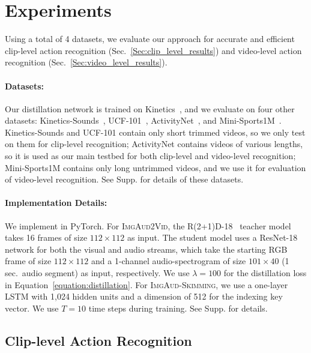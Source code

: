 \section{Experiments}\label{sec:results}
\vspace{-0.05in}

Using a total of 4 datasets, we evaluate our approach for accurate and efficient clip-level action recognition (Sec.~\ref{Sec:clip_level_results}) and video-level action recognition (Sec.~\ref{Sec:video_level_results}).

\vspace{-0.05in}
\paragraph{Datasets:} Our distillation network is trained on Kinetics~\cite{kay2017kinetics}, and we evaluate on four other datasets: Kinetics-Sounds~\cite{arandjelovic2017look}, UCF-101~\cite{soomro2012ucf101}, ActivityNet~\cite{caba2015activitynet}, and Mini-Sports1M~\cite{karpathy2014large}. Kinetics-Sounds and UCF-101 contain only short trimmed videos, so we only test on them for clip-level recognition; ActivityNet contains videos of various lengths, so it is used as our main testbed for both clip-level and video-level recognition; Mini-Sports1M contains only long untrimmed videos, and we use it for evaluation of video-level recognition. See Supp. for details of these datasets.

\vspace{-0.05in}
\paragraph{Implementation Details:} We implement in PyTorch. For \textsc{ImgAud2Vid}, the R(2+1)D-18~\cite{tran2018closer} teacher model takes 16 frames of size $112 \times 112$ as input. The student model uses a ResNet-18 network for both the visual and audio streams, which take the starting RGB frame of size $112 \times 112$ and a 1-channel audio-spectrogram of size $101 \times 40$ (1 sec.~audio segment) as input, respectively. We use $\lambda=100$ for the distillation loss in Equation~\ref{equation:distillation}. For \textsc{ImgAud-Skimming}, we use a one-layer LSTM with 1,024 hidden units and a dimension of 512 for the indexing key vector.  We use $T = 10$ time steps during training. See Supp. for details.

\vspace{-0.05in}
\subsection{Clip-level Action Recognition}~\label{Sec:clip_level_results}
\vspace{-0.2in}

